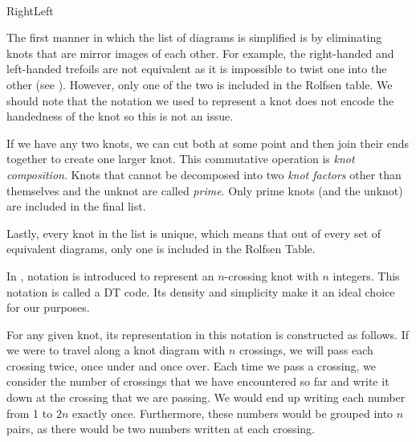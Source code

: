 \begin{paper}
\hfill
{}\\

\hspace{0.05\columnwidth}Right\hspace{0.5\columnwidth}Left\\


The first manner in which the list of diagrams is simplified is by eliminating
knots that are mirror images of each other.
For example, the right-handed and left-handed trefoils are not equivalent as it
is impossible to twist one into the other (see \figTrefoil).
However, only one of the two is included in the Rolfsen table.
We should note that the notation we used to represent a knot does not
encode the handedness of the knot so this is not an issue.

If we have any two knots, we can cut both at some point and then join their ends
together to create one larger knot.
This commutative operation is \textit{knot composition}.
Knots that cannot be decomposed into two \textit{knot factors} other than
themselves and the unknot are called \textit{prime}.
Only prime knots (and the unknot) are included in the final list.

Lastly, every knot in the list is unique, which means that out of every set of
equivalent diagrams, only one is included in the Rolfsen Table.


In \cite{htw}, notation is introduced to represent an $n$-crossing knot with
$n$ integers.
This notation is called a DT code.
Its density and simplicity make it an ideal choice for our purposes.

For any given knot, its representation in this notation is constructed as
follows.
If we were to travel along a knot diagram with $n$ crossings, we will pass each
crossing twice, once under and once over.
Each time we pass a crossing, we consider the number of crossings that we
have encountered so far and write it down at the crossing that we are passing.
We would end up writing each number from 1 to $2n$ exactly once.
Furthermore, these numbers would be grouped into $n$ pairs, as there would be
two numbers written at each crossing.


\end{paper}
